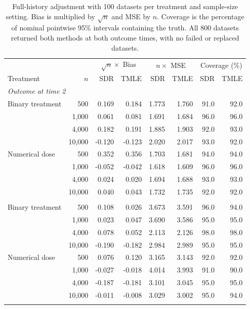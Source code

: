 \begin{table}[!htbp]
\centering\small
\setlength{\tabcolsep}{4pt}
\caption{Full-history adjustment with 100 datasets per treatment and sample-size setting. Bias is multiplied by $\sqrt n$ and MSE by $n$. Coverage is the percentage of nominal pointwise 95\% intervals containing the truth. All 800 datasets returned both methods at both outcome times, with no failed or replaced datasets.}
\label{tab:sim-full-history}
\begin{tabular}{lr*{6}{r}}
\toprule
& & \multicolumn{2}{c}{$\sqrt n\times$ Bias} & \multicolumn{2}{c}{$n\times$ MSE} & \multicolumn{2}{c}{Coverage (\%)}\\
Treatment & $n$ & SDR & TMLE & SDR & TMLE & SDR & TMLE\\
\midrule
\multicolumn{8}{l}{\textit{Outcome at time 2}}\\
Binary treatment & 500 & 0.169 & 0.184 & 1.773 & 1.760 & 91.0 & 92.0\\
 & 1,000 & 0.061 & 0.081 & 1.691 & 1.684 & 96.0 & 96.0\\
 & 4,000 & 0.182 & 0.191 & 1.885 & 1.903 & 92.0 & 93.0\\
 & 10,000 & -0.120 & -0.123 & 2.020 & 2.017 & 93.0 & 92.0\\
\addlinespace
Numerical dose & 500 & 0.352 & 0.356 & 1.703 & 1.681 & 94.0 & 94.0\\
 & 1,000 & -0.052 & -0.042 & 1.618 & 1.609 & 96.0 & 96.0\\
 & 4,000 & 0.024 & 0.020 & 1.694 & 1.688 & 93.0 & 93.0\\
 & 10,000 & 0.040 & 0.043 & 1.732 & 1.735 & 92.0 & 92.0\\
\addlinespace
\midrule
\multicolumn{8}{l}{\textit{Outcome at time 3}}\\
Binary treatment & 500 & 0.108 & 0.026 & 3.673 & 3.591 & 96.0 & 94.0\\
 & 1,000 & 0.023 & 0.047 & 3.690 & 3.586 & 95.0 & 95.0\\
 & 4,000 & 0.078 & 0.052 & 2.113 & 2.126 & 98.0 & 98.0\\
 & 10,000 & -0.190 & -0.182 & 2.984 & 2.989 & 95.0 & 95.0\\
\addlinespace
Numerical dose & 500 & 0.076 & 0.120 & 3.165 & 3.143 & 92.0 & 92.0\\
 & 1,000 & -0.027 & -0.018 & 4.014 & 3.993 & 91.0 & 90.0\\
 & 4,000 & -0.187 & -0.181 & 3.101 & 3.045 & 95.0 & 95.0\\
 & 10,000 & -0.011 & -0.008 & 3.029 & 3.002 & 95.0 & 94.0\\
\addlinespace
\bottomrule
\end{tabular}
\end{table}

